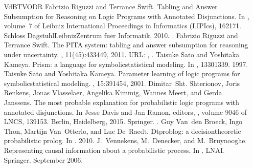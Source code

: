\documentclass[letterpaper,10pt,english]{sphinxmanual}
\begin{document}
\begin{sphinxthebibliography}{VdBTVODR}
\sphinxAtStartPar
Fabrizio Riguzzi and Terrance Swift. Tabling and Answer Subsumption for Reasoning on Logic Programs with Annotated Disjunctions. In , volume 7 of Leibniz International Proceedings in Informatics (LIPIcs), 162\textendash{}171. Schloss Dagstuhl\textendash{}Leibniz\sphinxhyphen{}Zentrum fuer Informatik, 2010. .
\sphinxAtStartPar
Fabrizio Riguzzi and Terrance Swift. The PITA system: tabling and answer subsumption for reasoning under uncertainty. , 11(4\textendash{}5):433\textendash{}449, 2011. URL: , .
\sphinxAtStartPar
Taisuke Sato and Yoshitaka Kameya. Prism: a language for symbolic\sphinxhyphen{}statistical modeling. In , 1330\textendash{}1339. 1997.
\sphinxAtStartPar
Taisuke Sato and Yoshitaka Kameya. Parameter learning of logic programs for symbolic\sphinxhyphen{}statistical modeling. , 15:391\textendash{}454, 2001.
\sphinxAtStartPar
Dimitar Sht. Shterionov, Joris Renkens, Jonas Vlasselaer, Angelika Kimmig, Wannes Meert, and Gerda Janssens. The most probable explanation for probabilistic logic programs with annotated disjunctions. In Jesse Davis and Jan Ramon, editors, , volume 9046 of LNCS, 139\textendash{}153. Berlin, Heidelberg, 2015. Springer. .
\sphinxAtStartPar
Guy Van den Broeck, Ingo Thon, Martijn Van Otterlo, and Luc De Raedt. Dtproblog: a decision\sphinxhyphen{}theoretic probabilistic prolog. In . 2010.
\sphinxAtStartPar
J. Vennekens, M. Denecker, and M. Bruynooghe. Representing causal information about a probabilistic process. In , LNAI. Springer, September 2006.

\end{sphinxthebibliography}
\end{document}
